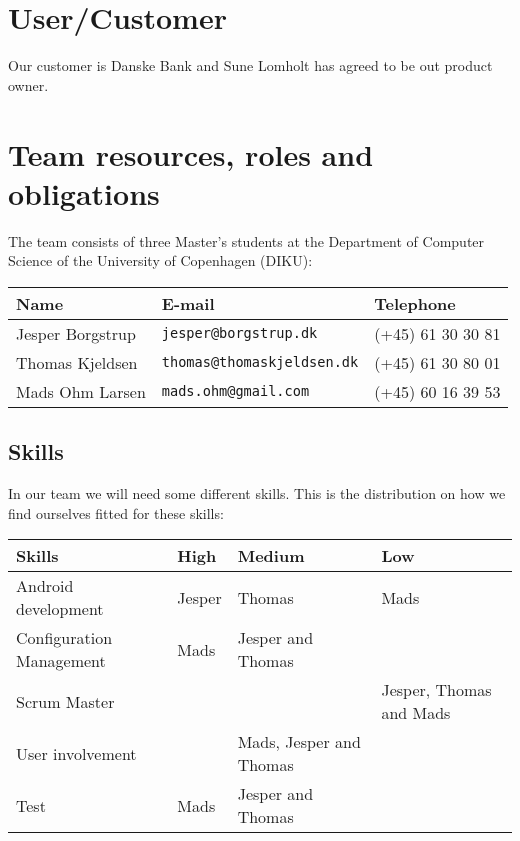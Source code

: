 \documentclass[a4paper,11pt]{article}
\begin{document}

\section{User/Customer} %
\label{sec:user_customer}

Our customer is Danske Bank and Sune Lomholt has agreed to be out product owner.


\section{Team resources, roles and obligations} %
\label{sec:team_resources_roles_and_obligations}
The team consists of three Master's students at the Department of Computer Science of the University of Copenhagen (DIKU): \\

\begin{tabular}{|p{4.5cm}|p{5cm}|p{3.5cm}|}
\hline
\textbf{Name}    & E-mail				          &	Telephone         \\\hline
Jesper Borgstrup & {\tt jesper@borgstrup.dk} 	  & (+45) 61 30 30 81 \\\hline
Thomas Kjeldsen  & {\tt thomas@thomaskjeldsen.dk} & (+45) 61 30 80 01 \\\hline
Mads Ohm Larsen  & {\tt mads.ohm@gmail.com} 	  & (+45) 60 16 39 53 \\\hline
\end{tabular}

\subsection{Skills} %
\label{subsec:skills}
In our team we will need some different skills.
This is the distribution on how we find ourselves fitted for these skills: \\

\begin{tabular}{|p{4.5cm}|p{3cm}|p{3cm}|p{3cm}|}
\hline
\textbf{Skills}          & \textbf{High}   & \textbf{Medium} & \textbf{Low} 					 \\\hline
Android development      & Jesper & Thomas & Mads 					 \\\hline
Configuration Management & Mads & Jesper and Thomas          &      					 \\\hline
Scrum Master             &        &        & Jesper, Thomas and Mads \\\hline 
User involvement         &        & Mads, Jesper and Thomas & \\\hline
Test                     & Mads   & Jesper and Thomas & \\\hline
\end{tabular}
\end{document}
